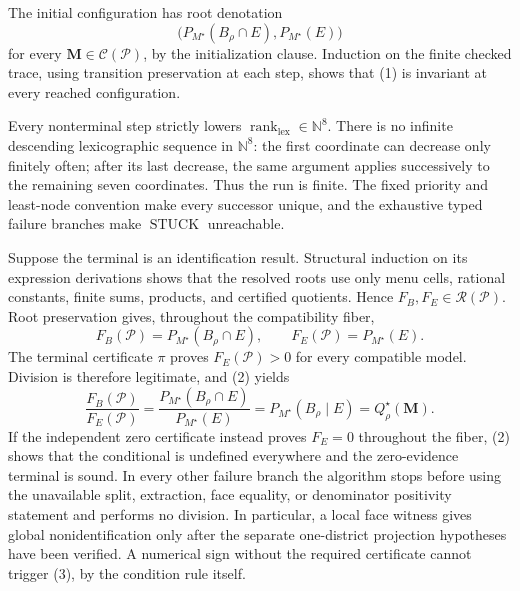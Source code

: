 The initial configuration has root denotation
\[
\bigl(P_{M^\star}(B_\rho\cap E),P_{M^\star}(E)\bigr)\tag{1}
\]
for every \(\mathbf M\in\mathcal C(\mathcal P)\), by the initialization clause. Induction on the finite checked trace, using transition preservation at each step, shows that (1) is invariant at every reached configuration.

Every nonterminal step strictly lowers \(\operatorname{rank}_{\mathrm{lex}}\in\mathbb N^8\). There is no infinite descending lexicographic sequence in \(\mathbb N^8\): the first coordinate can decrease only finitely often; after its last decrease, the same argument applies successively to the remaining seven coordinates. Thus the run is finite. The fixed priority and least-node convention make every successor unique, and the exhaustive typed failure branches make \(\operatorname{STUCK}\) unreachable.

Suppose the terminal is an identification result. Structural induction on its expression derivations shows that the resolved roots use only menu cells, rational constants, finite sums, products, and certified quotients. Hence
\(F_B,F_E\in\mathscr R(\mathcal P)\). Root preservation gives, throughout the compatibility fiber,
\[
F_B(\mathcal P)=P_{M^\star}(B_\rho\cap E),\qquad
F_E(\mathcal P)=P_{M^\star}(E).\tag{2}
\]
The terminal certificate \(\pi\) proves \(F_E(\mathcal P)>0\) for every compatible model. Division is therefore legitimate, and (2) yields
\[
\frac{F_B(\mathcal P)}{F_E(\mathcal P)}
=\frac{P_{M^\star}(B_\rho\cap E)}{P_{M^\star}(E)}
=P_{M^\star}(B_\rho\mid E)
=Q_\rho^\star(\mathbf M).\tag{3}
\]
If the independent zero certificate instead proves \(F_E=0\) throughout the fiber, (2) shows that the conditional is undefined everywhere and the zero-evidence terminal is sound. In every other failure branch the algorithm stops before using the unavailable split, extraction, face equality, or denominator positivity statement and performs no division. In particular, a local face witness gives global nonidentification only after the separate one-district projection hypotheses have been verified. A numerical sign without the required certificate cannot trigger (3), by the condition rule itself.